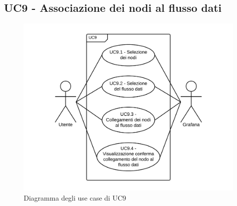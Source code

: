 \subsection{UC9 - Associazione dei nodi al flusso dati}
\begin{figure}[H]
\includegraphics{img/UC9_-_Associazione_dei_nodi_al_flusso_dati.png}
\caption{Diagramma degli use case di UC9}
\end{figure}
